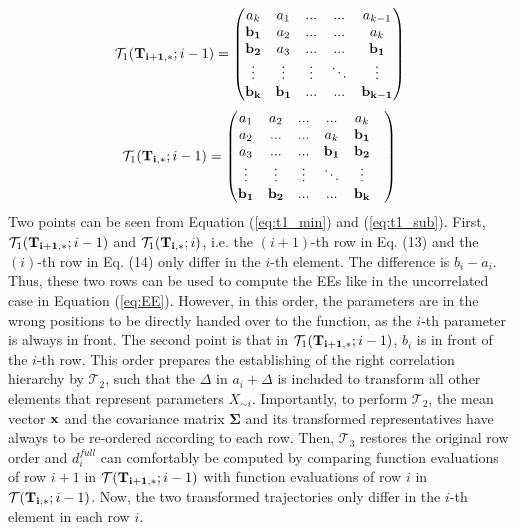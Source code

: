 \documentclass[a4paper,12pt]{article}
\begin{document}
\begin{align} \label{eq:t1_min}
\mathcal{T}_1(\bold{T_{i+1,*}}; i-1)
=
\begin{pmatrix}
a_k & a_1 & ... & ... &  a_{k-1} \\
\bold{b_1} & a_2 & ... & ... &  a_k \\
\bold{b_2} & a_3 & ... & ... &  \bold{b_1} \\
\vdots & \vdots & \vdots & 	\ddots &  \vdots\\
\bold{b_k} & \bold{b_{1}} & ... & ... &  \bold{b_{k-1}}
\end{pmatrix}
\end{align}
\begin{align} \label{eq:t1_sub}
\mathcal{T}_1(\bold{T_{i,*}}; i-1)=
\begin{pmatrix}
a_1 & a_2 & ... & ... &  a_k \\
a_2 & ... & ... &  a_k & \bold{b_1} \\
a_3 & ... & ... &  \bold{b_1} & \bold{b_2} & \\
\vdots & \vdots & \vdots & 	\ddots &  \vdots\\
\bold{b_1} & \bold{b_{2}} & ... & ... &  \bold{b_{k}}
\end{pmatrix}
\end{align}
Two points can be seen from Equation (\ref{eq:t1_min}) and (\ref{eq:t1_sub}). First, $\mathcal{T}_1(\bold{T_{i+1,*}}; i-1)$ and $\mathcal{T}_1(\bold{T_{i,*}}; i)$, i.e. the $(i+1)$-th row in Eq. (13) and the $(i)$-th row in Eq. (14) only differ in the $i$-th element. The difference is $b_i - a_i$. Thus, these two rows can be used to compute the EEs like in the uncorrelated case in Equation (\ref{eq:EE}). However, in this order, the parameters are in the wrong positions to be directly handed over to the function, as the $i$-th parameter is always in front. The second point is that in $\mathcal{T}_1(\bold{T_{i+1,*}}; i-1)$, $b_i$ is in front of the $i$-th row. This order prepares the establishing of the right correlation hierarchy by $\mathcal{T}_2$, such that the $\Delta$ in $a_i + \Delta$ is included to transform all other elements that represent parameters $X_{\sim i}$. Importantly, to perform $\mathcal{T}_2$, the mean vector $\bold{x}$ and the covariance matrix $\pmb{\Sigma}$ and its transformed representatives have always to be re-ordered according to each row. 
Then, $\mathcal{T}_3$ restores the original row order and $d_i^{full}$ can comfortably be computed by comparing function evaluations of row $i+1$ in $\mathcal{T}(\bold{T_{i+1,*}}; i-1)$ with function evaluations of row $i$ in $\mathcal{T}(\bold{T_{i,*}}; i-1)$. Now, the two transformed trajectories only differ in the $i$-th element in each row $i$. \\
\end{document}
